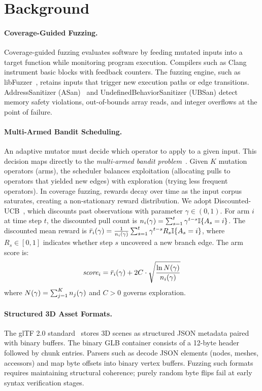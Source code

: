 \section{Background}
\label{sec:background}

\paragraph{Coverage-Guided Fuzzing.}
Coverage-guided fuzzing evaluates software by feeding mutated inputs into a target function while monitoring program execution.
Compilers such as Clang instrument basic blocks with feedback counters.
The fuzzing engine, such as libFuzzer~\cite{serebryany2016libfuzzer}, retains inputs that trigger new execution paths or edge transitions.
AddressSanitizer (ASan)~\cite{serebryany2012asan} and UndefinedBehaviorSanitizer (UBSan) detect memory safety violations, out-of-bounds array reads, and integer overflows at the point of failure.

\paragraph{Multi-Armed Bandit Scheduling.}
An adaptive mutator must decide which operator to apply to a given input.
This decision maps directly to the \emph{multi-armed bandit problem}~\cite{auer2002ucb}.
Given $K$ mutation operators (arms), the scheduler balances exploitation (allocating pulls to operators that yielded new edges) with exploration (trying less frequent operators).
In coverage fuzzing, rewards decay over time as the input corpus saturates, creating a non-stationary reward distribution.
We adopt Discounted-UCB~\cite{garivier2011nonstationary}, which discounts past observations with parameter $\gamma \in (0, 1)$.
For arm $i$ at time step $t$, the discounted pull count is $n_{i}(\gamma) = \sum_{s=1}^t \gamma^{t-s} \mathbb{I}\{A_s = i\}$.
The discounted mean reward is $\bar{r}_{i}(\gamma) = \frac{1}{n_{i}(\gamma)} \sum_{s=1}^t \gamma^{t-s} R_s \mathbb{I}\{A_s = i\}$, where $R_s \in [0, 1]$ indicates whether step $s$ uncovered a new branch edge.
The arm score is:
\begin{equation}
\label{eq:ucb1}
\mathit{score}_{i} = \bar{r}_{i}(\gamma) + 2 C \cdot \sqrt{\frac{\ln N(\gamma)}{n_{i}(\gamma)}}
\end{equation}
where $N(\gamma) = \sum_{j=1}^K n_{j}(\gamma)$ and $C > 0$ governs exploration.

\paragraph{Structured 3D Asset Formats.}
The glTF 2.0 standard~\cite{khronos_gltf2} stores 3D scenes as structured JSON metadata paired with binary buffers.
The binary GLB container consists of a 12-byte header followed by chunk entries.
Parsers such as \fastgltf decode JSON elements (nodes, meshes, accessors) and map byte offsets into binary vertex buffers.
Fuzzing such formats requires maintaining structural coherence; purely random byte flips fail at early syntax verification stages.

